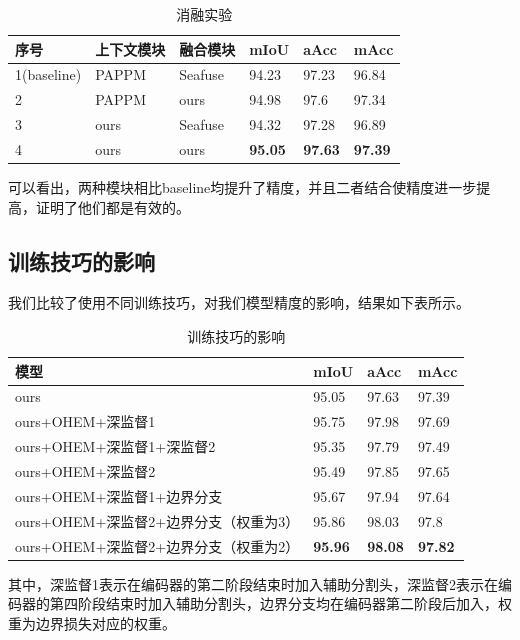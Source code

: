 \documentclass[11pt]{article}
\begin{document}
\begin{table}[h]
  \centering
  \begin{tabular}{|l|l|l|l|l|l|}
  \hline
      序号 & 上下文模块 & 融合模块 & mIoU & aAcc & mAcc \\ \hline
      1(baseline) & PAPPM & Seafuse & 94.23 & 97.23 & 96.84 \\ \hline
      2 & PAPPM & ours & 94.98 & 97.6 & 97.34 \\ \hline
      3 & ours & Seafuse & 94.32 & 97.28 & 96.89 \\ \hline
      4 & ours & ours & \textbf{95.05} & \textbf{97.63} & \textbf{97.39} \\ \hline
  \end{tabular}
  \caption{消融实验}
\end{table}

可以看出，两种模块相比baseline均提升了精度，并且二者结合使精度进一步提高，证明了他们都是有效的。
\subsection{训练技巧的影响}

我们比较了使用不同训练技巧，对我们模型精度的影响，结果如下表所示。
\begin{table}[H]
  \centering
  \begin{tabular}{|l|l|l|l|}
  \hline
      模型 & mIoU & aAcc & mAcc \\ \hline
      ours & 95.05 & 97.63 & 97.39 \\ \hline
      ours+OHEM+深监督1 & 95.75 & 97.98 & 97.69 \\ \hline
      ours+OHEM+深监督1+深监督2 & 95.35 & 97.79 & 97.49 \\ \hline
      ours+OHEM+深监督2 & 95.49 & 97.85 & 97.65 \\ \hline
      ours+OHEM+深监督1+边界分支 & 95.67 & 97.94 & 97.64 \\ \hline
      ours+OHEM+深监督2+边界分支（权重为3） & 95.86 & 98.03 & 97.8 \\ \hline
      ours+OHEM+深监督2+边界分支（权重为2） & \textbf{95.96} & \textbf{98.08} & \textbf{97.82} \\ \hline
  \end{tabular}
  \caption{训练技巧的影响}
\end{table}

其中，深监督1表示在编码器的第二阶段结束时加入辅助分割头，深监督2表示在编码器的第四阶段结束时加入辅助分割头，边界分支均在编码器第二阶段后加入，权重为边界损失对应的权重。
\end{document}
